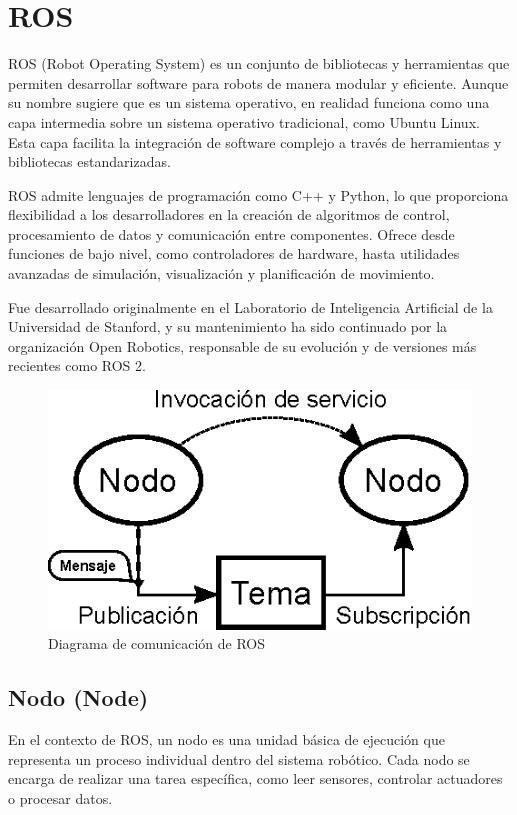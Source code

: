\section{ROS} \label{sec:ros}

ROS (Robot Operating System) es un conjunto de bibliotecas y herramientas que permiten desarrollar software para robots de manera modular y eficiente. Aunque su nombre sugiere que es un sistema operativo, en realidad funciona como una capa intermedia sobre un sistema operativo tradicional, como Ubuntu Linux. Esta capa facilita la integración de software complejo a través de herramientas y bibliotecas estandarizadas.

ROS admite lenguajes de programación como C++ y Python, lo que proporciona flexibilidad a los desarrolladores en la creación de algoritmos de control, procesamiento de datos y comunicación entre componentes. Ofrece desde funciones de bajo nivel, como controladores de hardware, hasta utilidades avanzadas de simulación, visualización y planificación de movimiento.

Fue desarrollado originalmente en el Laboratorio de Inteligencia Artificial de la Universidad de Stanford, y su mantenimiento ha sido continuado por la organización Open Robotics, responsable de su evolución y de versiones más recientes como ROS 2.

\begin{figure}[h]
	\centering
	\includegraphics[width=0.5\linewidth]{img/ROS_concepts}
	\caption{Diagrama de comunicación de ROS}
	\label{fig:rosconcepts}
\end{figure}



\subsection{Nodo (Node)}

En el contexto de ROS, un nodo es una unidad básica de ejecución que representa un proceso individual dentro del sistema robótico. Cada nodo se encarga de realizar una tarea específica, como leer sensores, controlar actuadores o procesar datos.

